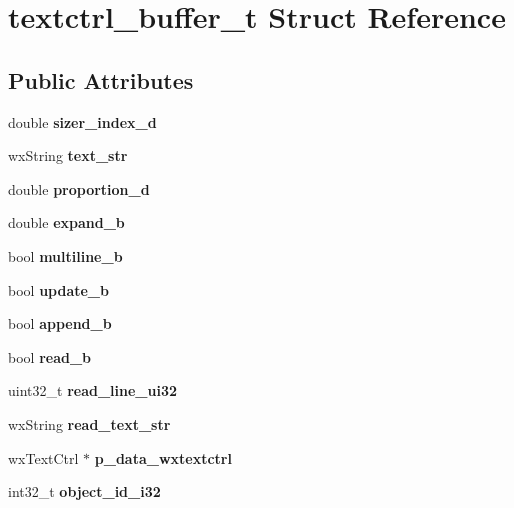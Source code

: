 \section{textctrl\+\_\+buffer\+\_\+t Struct Reference}
\label{structtextctrl__buffer__t}
\subsection*{Public Attributes}
\begin{DoxyCompactItemize}
\item 
\mbox{\label{structtextctrl__buffer__t_a1c8b205d4913134947e514497fbe3850}} 
double {\bfseries sizer\+\_\+index\+\_\+d}
\item 
\mbox{\label{structtextctrl__buffer__t_a564aa29286a86ac1ea1c732243fff0a1}} 
wx\+String {\bfseries text\+\_\+str}
\item 
\mbox{\label{structtextctrl__buffer__t_a5b7beb0ec72a447f977b04138910ccb5}} 
double {\bfseries proportion\+\_\+d}
\item 
\mbox{\label{structtextctrl__buffer__t_a4238dbe00527c72509ad8bd6dd2a17ef}} 
double {\bfseries expand\+\_\+b}
\item 
\mbox{\label{structtextctrl__buffer__t_abce42e0d70ddaef2cdd4f01280a4edb3}} 
bool {\bfseries multiline\+\_\+b}
\item 
\mbox{\label{structtextctrl__buffer__t_a90f4aa6a173b42d963cd6b1bbb53fa42}} 
bool {\bfseries update\+\_\+b}
\item 
\mbox{\label{structtextctrl__buffer__t_ab5eb13eec0363d01d28c035feba5d2ba}} 
bool {\bfseries append\+\_\+b}
\item 
\mbox{\label{structtextctrl__buffer__t_a226750561134de681ecca1713a774ef4}} 
bool {\bfseries read\+\_\+b}
\item 
\mbox{\label{structtextctrl__buffer__t_a3a3e5d4f491ba9531db9dc09bfffc61e}} 
uint32\+\_\+t {\bfseries read\+\_\+line\+\_\+ui32}
\item 
\mbox{\label{structtextctrl__buffer__t_acef444d387b7e56f64cfe73c4b874b52}} 
wx\+String {\bfseries read\+\_\+text\+\_\+str}
\item 
\mbox{\label{structtextctrl__buffer__t_aba1cc8feb1c86c77a150cf2a744f9c5a}} 
wx\+Text\+Ctrl $\ast$ {\bfseries p\+\_\+data\+\_\+wxtextctrl}
\item 
\mbox{\label{structtextctrl__buffer__t_a491f65709635990e03d451b1aea454dd}} 
int32\+\_\+t {\bfseries object\+\_\+id\+\_\+i32}
\end{DoxyCompactItemize}



